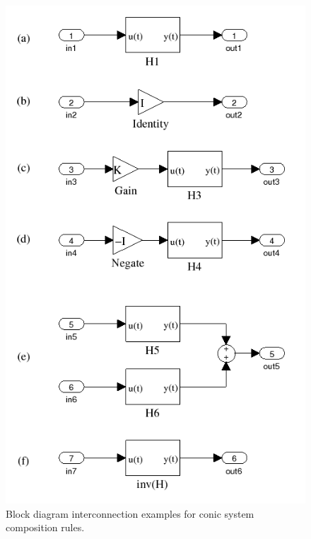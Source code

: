 \begin{figure}[htb]
\centering
\includegraphics[width=0.95\columnwidth]{figures/mod_examples.png}
    \caption{Block diagram interconnection examples for conic system composition rules.}
    \label{fig:examples}
\end{figure}

